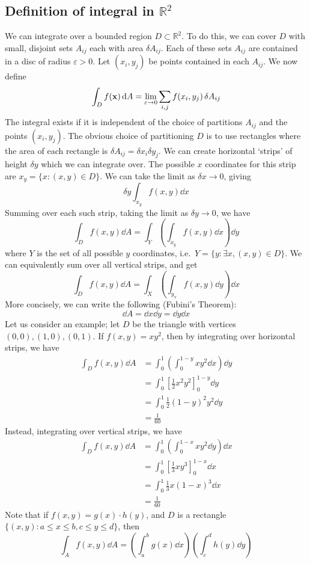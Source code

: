\subsection{Definition of integral in \(\mathbb R^2\)}
We can integrate over a bounded region \(D \subset \mathbb R^2\).
To do this, we can cover \(D\) with small, disjoint sets \(A_{ij}\) each with area \(\delta A_{ij}\).
Each of these sets \(A_{ij}\) are contained in a disc of radius \(\varepsilon > 0\).
Let \((x_i, y_j)\) be points contained in each \(A_{ij}\).
We now define
\[
	\int_D f(\vb x) \dd{A} = \lim_{\varepsilon \to 0} \sum_{i, j} f(x_i, y_j) \,\delta A_{ij}
\]
The integral exists if it is independent of the choice of partitions \(A_{ij}\) and the points \((x_i, y_j)\).
The obvious choice of partitioning \(D\) is to use rectangles where the area of each rectangle is \(\delta A_{ij} = \delta x_i \delta y_j\).
We can create horizontal `strips' of height \(\delta y\) which we can integrate over.
The possible \(x\) coordinates for this strip are \(x_y = \{ x \colon (x, y) \in D \}\).
We can take the limit as \(\delta x \to 0\), giving
\[
	\delta y \int_{x_y} f(x, y) \dd{x}
\]
Summing over each such strip, taking the limit as \(\delta y \to 0\), we have
\[
	\int_D f(x, y) \dd{A} = \int_Y \left( \int_{x_y} f(x, y) \dd{x} \right) \dd{y}
\]
where \(Y\) is the set of all possible \(y\) coordinates, i.e.\ \(Y = \{ y \colon \exists x, (x, y) \in D \}\).
We can equivalently sum over all vertical strips, and get
\[
	\int_D f(x, y) \dd{A} = \int_X \left( \int_{y_x} f(x, y) \dd{y} \right) \dd{x}
\]
More concisely, we can write the following (Fubini's Theorem):
\[
	\dd{A} = \dd{x} \dd{y} = \dd{y} \dd{x}
\]
Let us consider an example; let \(D\) be the triangle with vertices \((0, 0), (1, 0), (0, 1)\).
If \(f(x, y) = xy^2\), then by integrating over horizontal strips, we have
\begin{align*}
	\int_D f(x, y) \dd{A} & = \int_0^1 \left( \int_0^{1-y} xy^2 \dd{x} \right) \dd{y}  \\
	                      & = \int_0^1 \left[ \frac{1}{2}x^2y^2 \right]_0^{1-y} \dd{y} \\
	                      & = \int_0^1 \frac{1}{2}(1-y)^2y^2 \dd{y}                    \\
	                      & = \frac{1}{60}
\end{align*}
Instead, integrating over vertical strips, we have
\begin{align*}
	\int_D f(x, y) \dd{A} & = \int_0^1 \left( \int_0^{1-x} xy^2 \dd{y} \right) \dd{x} \\
	                      & = \int_0^1 \left[ \frac{1}{3} xy^3 \right]_0^{1-x} \dd{x} \\
	                      & = \int_0^1 \frac{1}{3} x(1-x)^3 \dd{x}                    \\
	                      & = \frac{1}{60}
\end{align*}
Note that if \(f(x, y) = g(x) \cdot h(y)\), and \(D\) is a rectangle \(\{ (x, y) \colon a \leq x \leq b, c \leq y \leq d \}\), then
\[
	\int_A f(x, y) \dd{A} = \left( \int_a^b g(x) \dd{x} \right)\left( \int_c^d h(y) \dd{y} \right)
\]

